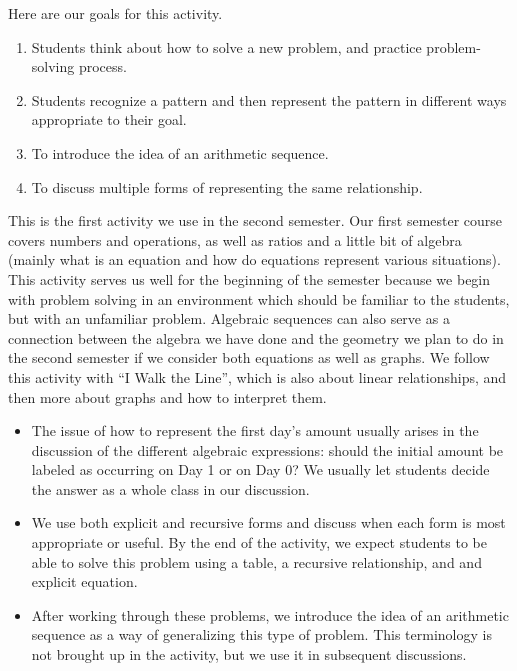 \documentclass{ximera}
\begin{document}
\begin{instructorNotes}
Here are our goals for this activity.
\begin{enumerate}
\item Students think about how to solve a new problem, and practice problem-solving process.
\item  Students recognize a pattern and then represent the pattern in different ways appropriate to their goal.
\item  To introduce the idea of an arithmetic sequence.
\item To discuss multiple forms of representing the same relationship. 
\end{enumerate}

This is the first activity we use in the second semester.  Our first semester course covers numbers and operations, as well as ratios and a little bit of algebra (mainly what is an equation and how do equations represent various situations).  This activity serves us well for the beginning of the semester because we begin with problem solving in an environment which should be familiar to the students, but with an unfamiliar problem.  Algebraic sequences can also serve as a connection between the algebra we have done and the geometry we plan to do in the second semester if we consider both equations as well as graphs.  We follow this activity with ``I Walk the Line'', which is also about linear relationships, and then more about graphs and how to interpret them. 

\begin{itemize}
\item The issue of how to represent the first day's amount usually arises in the discussion of the different algebraic expressions:  should the initial amount be labeled as occurring on Day 1 or on Day 0? We usually let students decide the answer as a whole class in our discussion.
\item We use both explicit and recursive forms and discuss when each form is most appropriate or useful.  By the end of the activity, we expect students to be able to solve this problem using a table, a recursive relationship, and and explicit equation.
\item After working through these problems, we introduce the idea of an arithmetic sequence as a way of generalizing this type of problem.  This terminology is not brought up in the activity, but we use it in subsequent discussions.
\end{itemize}

\end{instructorNotes}
\end{document}
